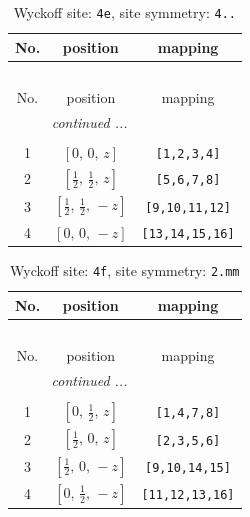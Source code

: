 \documentclass[fleqn,8pt]{jsarticle}
\begin{document}
\begin{longtable}{ccc}
\caption{Wyckoff site: {\tt 4e}, site symmetry: {\tt 4..}}
 \\
 \hline \hline
No. & position & mapping \\ \hline \endfirsthead

\multicolumn{2}{l}{\tablename\ \thetable{}} \\
 \hline \hline
No. & position & mapping \\ \hline \endhead

 \hline \hline
\multicolumn{2}{r}{\footnotesize\it continued ...} \\ \endfoot

 \hline \hline
\multicolumn{2}{r}{} \\ \endlastfoot

1 & $\left[ 0,\, 0,\, z \right]$ & {\tt [1,2,3,4]} \\ \hline
2 & $\left[ \frac{1}{2},\, \frac{1}{2},\, z \right]$ & {\tt [5,6,7,8]} \\ \hline
3 & $\left[ \frac{1}{2},\, \frac{1}{2},\, - z \right]$ & {\tt [9,10,11,12]} \\ \hline
4 & $\left[ 0,\, 0,\, - z \right]$ & {\tt [13,14,15,16]} \\
\end{longtable}
\renewcommand{\arraystretch}{1.2}
\begin{longtable}{ccc}
\caption{Wyckoff site: {\tt 4f}, site symmetry: {\tt 2.mm}}
 \\
 \hline \hline
No. & position & mapping \\ \hline \endfirsthead

\multicolumn{2}{l}{\tablename\ \thetable{}} \\
 \hline \hline
No. & position & mapping \\ \hline \endhead

 \hline \hline
\multicolumn{2}{r}{\footnotesize\it continued ...} \\ \endfoot

 \hline \hline
\multicolumn{2}{r}{} \\ \endlastfoot

1 & $\left[ 0,\, \frac{1}{2},\, z \right]$ & {\tt [1,4,7,8]} \\ \hline
2 & $\left[ \frac{1}{2},\, 0,\, z \right]$ & {\tt [2,3,5,6]} \\ \hline
3 & $\left[ \frac{1}{2},\, 0,\, - z \right]$ & {\tt [9,10,14,15]} \\ \hline
4 & $\left[ 0,\, \frac{1}{2},\, - z \right]$ & {\tt [11,12,13,16]} \\
\end{longtable}
\end{document}
